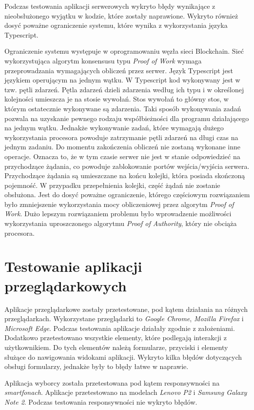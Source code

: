 \documentclass[a4paper,12pt]{book}
\begin{document}
Podczas testowania aplikacji serwerowych wykryto błędy wynikające z nieobsłużonego wyjątku w kodzie, które zostały naprawione. Wykryto również dosyć poważne ograniczenie systemu, które wynika z wykorzystania języka Typescript.
 
Ograniczenie systemu występuje w oprogramowaniu węzła sieci Blockchain. Sieć wykorzystująca algorytm konsensusu typu \textit{Proof of Work} wymaga przeprowadzania wymagających obliczeń przez serwer. Język Typescript jest językiem operującym na jednym wątku. W Typescript kod wykonywany jest w tzw. pętli zdarzeń. Pętla zdarzeń dzieli zdarzenia według ich typu i w określonej kolejności umieszcza je na stosie wywołań. Stos wywołań to główny stos, w którym ostatecznie wykonywane są zdarzenia. Taki sposób wykonywania zadań pozwala na uzyskanie pewnego rodzaju współbieżności dla programu działającego na jednym wątku. Jednakże wykonywanie zadań, które wymagają dużego wykorzystania procesora powoduje zatrzymanie pętli zdarzeń na długi czas na jednym zadaniu. Do momentu zakończenia obliczeń nie zostaną wykonane inne operacje. Oznacza to, że w tym czasie serwer nie jest w stanie odpowiedzieć na przychodzące żądania, co powoduje zablokowanie portów wejścia/wyjścia serwera. Przychodzące żądania są umieszczane na końcu kolejki, która posiada skończoną pojemność. W przypadku przepełnienia kolejki, część żądań nie zostanie obsłużona. Jest do dosyć poważne ograniczenie, którego częściowym rozwiązaniem było zmniejszenie wykorzystania mocy obliczeniowej przez algorytm \textit{Proof of Work}. Dużo lepszym rozwiązaniem problemu było wprowadzenie możliwości wykorzystania uproszczonego algorytmu \textit{Proof of Authority}, który nie obciąża procesora.

\section{Testowanie aplikacji przeglądarkowych}

Aplikacje przeglądarkowe zostały przetestowane, pod kątem działania na różnych przeglądarkach. Wykorzystane przeglądarki to \textit{Google Chrome}, \textit{Mozilla Firefox} i \textit{Microsoft Edge}. Podczas testowania aplikacje działały zgodnie z założeniami. Dodatkowo przetestowano wszystkie elementy, które podlegają interakcji z użytkownikiem. Do tych elementów należą formularze, przyciski i elementy służące do nawigowania widokami aplikacji. Wykryto kilka błędów dotyczących obsługi formularzy, jednakże były to błędy łatwe w naprawie.

Aplikacja wyborcy została przetestowana pod kątem responsywności na \textit{smartfonach}. Aplikacje przetestowano na modelach \textit{Lenovo P2} i \textit{Samsung Galaxy Note 2}. Podczas testowania responsywności nie wykryto błędów.
 
\end{document}
